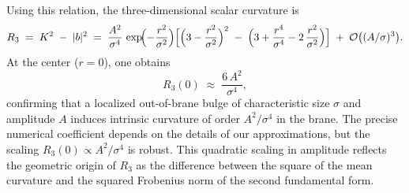 Using this relation, the three-dimensional scalar curvature is
\begin{equation}
R_3 \;=\; K^2 \;-\; |b|^2
\;=\; \frac{A^2}{\sigma^4}\,\exp\!\Bigl(-\frac{r^2}{\sigma^2}\Bigr)
\Bigl[
\Bigl(3 - \frac{r^2}{\sigma^2}\Bigr)^2
\;-\; \Bigl(3 + \frac{r^4}{\sigma^4} - 2\,\frac{r^2}{\sigma^2}\Bigr)
\Bigr]
\;+\; \mathcal{O}\bigl((A/\sigma)^3\bigr).
\end{equation}
At the center ($r=0$), one obtains
\begin{equation}
R_3(0) \;\approx\; \frac{6\,A^2}{\sigma^4},
\end{equation}
confirming that a localized out-of-brane bulge of characteristic size
$\sigma$ and amplitude $A$ induces intrinsic curvature of order
$A^2/\sigma^4$ in the brane. The precise numerical coefficient depends on the details of our approximations, but the scaling $R_3(0) \propto A^2/\sigma^4$ is robust. This quadratic scaling in amplitude
reflects the geometric origin of $R_3$ as the difference between the
square of the mean curvature and the squared Frobenius norm of the
second fundamental form.